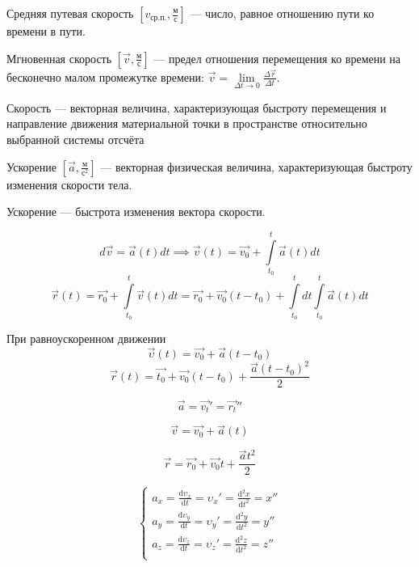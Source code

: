 \begin{definition}
    Средняя путевая скорость $[v_{ср.п.}, \frac{м}{с}]$ — число, равное отношению пути ко времени в пути.
\end{definition}

\begin{definition}
    Мгновенная скорость  $[\vec v, \frac{м}{с}]$ — предел отношения перемещения ко времени на бесконечно малом промежутке времени: 
$\vec v = \lim\limits_{\Delta t\to0}\frac{\Delta\vec r}{\Delta t}$.
\end{definition}

\begin{definition}
    Скорость — векторная величина, характеризующая быстроту перемещения и направление движения материальной точки в пространстве относительно выбранной системы отсчёта
\end{definition}

\begin{definition}
    Ускорение $[\vec a, \frac{м}{с^2}]$ — векторная физическая величина, характеризующая быстроту изменения скорости тела.
\end{definition}

\begin{remark}
    Ускорение — быстрота изменения вектора скорости.
\end{remark}

$$d\vec v = \vec a(t) dt \implies \vec v(t) = \vec{v_0} + \int\limits_{t_0}^{t} \vec a(t) dt$$
$$\vec r(t) = \vec{r_0} + \int\limits_{t_0}^{t} \vec v(t)dt = \vec{r_0} + \vec{v_0}(t-t_0) + \int\limits_{t_0}^{t} dt \int\limits_{t_0}^{t} \vec a(t) dt$$

При равноускоренном движении
$$\vec\upsilon(t)=\vec{v_0}+\vec a(t-t_0)$$
$$\vec r(t)=\vec{t_0}+\vec{v_0}(t-t_0)+\frac{\vec a(t-t_0)^2}{2}$$


$$\vec{a} = \vec{v_t}' = \vec{r_t}''$$

$$\vec{v} = \vec{v_0} + \vec{a}(t)$$

$$\vec{r} = \vec{r_0} + \vec{v_0}t + \frac{\vec a t^2}{2}$$

$$\begin{cases}
a_x=\frac{\mathrm{d}\upsilon_x}{\mathrm{d}t}=\upsilon_x'=\frac{\mathrm{d}^2x}{\mathrm{d}t^2}=x''\\
a_y=\frac{\mathrm{d}\upsilon_y}{\mathrm{d}t}=\upsilon_y'=\frac{\mathrm{d}^2y}{\mathrm{d}t^2}=y''\\
a_z=\frac{\mathrm{d}\upsilon_z}{\mathrm{d}t}=\upsilon_z'=\frac{\mathrm{d}^2z}{\mathrm{d}t^2}=z''\\
\end{cases}$$

